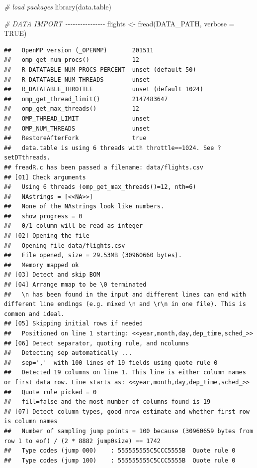 \documentclass[
  12pt,
]{style/krantz}
\newenvironment{Shaded}{\begin{snugshade}}{\end{snugshade}}
\newcommand{\AttributeTok}[1]{\textcolor[rgb]{0.77,0.63,0.00}{#1}}
\newcommand{\CommentTok}[1]{\textcolor[rgb]{0.56,0.35,0.01}{\textit{#1}}}
\newcommand{\ConstantTok}[1]{\textcolor[rgb]{0.00,0.00,0.00}{#1}}
\newcommand{\FunctionTok}[1]{\textcolor[rgb]{0.00,0.00,0.00}{#1}}
\newcommand{\NormalTok}[1]{#1}
\newcommand{\OtherTok}[1]{\textcolor[rgb]{0.56,0.35,0.01}{#1}}
\begin{document}
\begin{Shaded}
\begin{Highlighting}[]
\CommentTok{\# load packages}
\FunctionTok{library}\NormalTok{(data.table)}

\CommentTok{\# DATA IMPORT {-}{-}{-}{-}{-}{-}{-}{-}{-}{-}{-}{-}{-}{-}{-}{-}}
\NormalTok{flights }\OtherTok{\textless{}{-}} \FunctionTok{fread}\NormalTok{(DATA\_PATH, }\AttributeTok{verbose =} \ConstantTok{TRUE}\NormalTok{)}
\end{Highlighting}
\end{Shaded}

\begin{verbatim}
##   OpenMP version (_OPENMP)       201511
##   omp_get_num_procs()            12
##   R_DATATABLE_NUM_PROCS_PERCENT  unset (default 50)
##   R_DATATABLE_NUM_THREADS        unset
##   R_DATATABLE_THROTTLE           unset (default 1024)
##   omp_get_thread_limit()         2147483647
##   omp_get_max_threads()          12
##   OMP_THREAD_LIMIT               unset
##   OMP_NUM_THREADS                unset
##   RestoreAfterFork               true
##   data.table is using 6 threads with throttle==1024. See ?setDTthreads.
## freadR.c has been passed a filename: data/flights.csv
## [01] Check arguments
##   Using 6 threads (omp_get_max_threads()=12, nth=6)
##   NAstrings = [<<NA>>]
##   None of the NAstrings look like numbers.
##   show progress = 0
##   0/1 column will be read as integer
## [02] Opening the file
##   Opening file data/flights.csv
##   File opened, size = 29.53MB (30960660 bytes).
##   Memory mapped ok
## [03] Detect and skip BOM
## [04] Arrange mmap to be \0 terminated
##   \n has been found in the input and different lines can end with different line endings (e.g. mixed \n and \r\n in one file). This is common and ideal.
## [05] Skipping initial rows if needed
##   Positioned on line 1 starting: <<year,month,day,dep_time,sched_>>
## [06] Detect separator, quoting rule, and ncolumns
##   Detecting sep automatically ...
##   sep=','  with 100 lines of 19 fields using quote rule 0
##   Detected 19 columns on line 1. This line is either column names or first data row. Line starts as: <<year,month,day,dep_time,sched_>>
##   Quote rule picked = 0
##   fill=false and the most number of columns found is 19
## [07] Detect column types, good nrow estimate and whether first row is column names
##   Number of sampling jump points = 100 because (30960659 bytes from row 1 to eof) / (2 * 8882 jump0size) == 1742
##   Type codes (jump 000)    : 555555555C5CCC5555B  Quote rule 0
##   Type codes (jump 100)    : 555555555C5CCC5555B  Quote rule 0

\end{verbatim}
\end{document}

